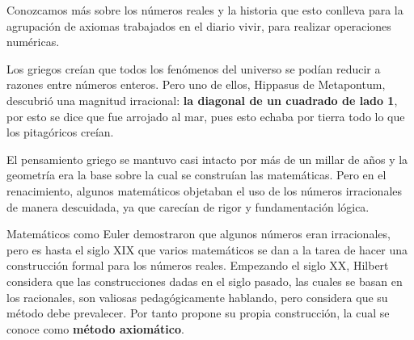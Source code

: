 \documentclass[12pt,a4paper]{article}
\begin{document}
\vspace{0.5cm}

Conozcamos más sobre los números reales y la historia que esto conlleva para la agrupación de axiomas trabajados en el diario vivir, para realizar operaciones numéricas.

\vspace{0.5cm}

\begin{tcolorbox}[colback=fondoazul,colframe=azuloscuro,breakable]

Los griegos creían que todos los fenómenos del universo se podían reducir a razones entre números enteros. Pero uno de ellos, Hippasus de Metapontum, descubrió una magnitud irracional: \textbf{la diagonal de un cuadrado de lado 1}, por esto se dice que fue arrojado al mar, pues esto echaba por tierra todo lo que los pitagóricos creían.

\vspace{0.5cm}

El pensamiento griego se mantuvo casi intacto por más de un millar de años y la geometría era la base sobre la cual se construían las matemáticas. Pero en el renacimiento, algunos matemáticos objetaban el uso de los números irracionales de manera descuidada, ya que carecían de rigor y fundamentación lógica.

\end{tcolorbox}


\vspace{0.5cm}

\begin{tcolorbox}[colback=fondoverde,colframe=verdeclaro,breakable]

Matemáticos como Euler demostraron que algunos números eran irracionales, pero es hasta el siglo XIX que varios matemáticos se dan a la tarea de hacer una construcción formal para los números reales. Empezando el siglo XX, Hilbert considera que las construcciones dadas en el siglo pasado, las cuales se basan en los racionales, son valiosas pedagógicamente hablando, pero considera que su método debe prevalecer. Por tanto propone su propia construcción, la cual se conoce como \textbf{método axiomático}.

\end{tcolorbox}

\vspace{0.5cm}
\end{document}
